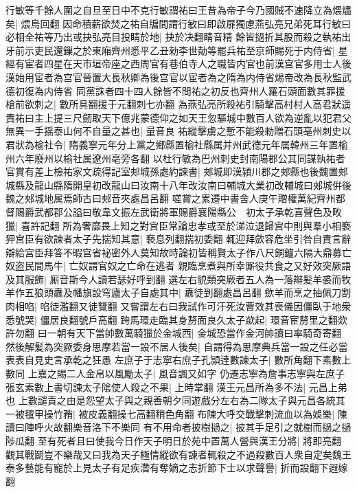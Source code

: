 行敏等千餘人圍之自旦至日中不克行敏謂祐曰王昔為帝子今乃國賊不速降立為煨燼矣|{
	煨烏回翻}
因命積薪欲焚之祐自牖間謂行敏曰即啟扉獨慮燕弘亮兄弟死耳行敏曰必相全祐等乃出或抉弘亮目投睛於地|{
	抉於决翻睛音精}
餘皆撾折其股而殺之執祐出牙前示吏民還鏁之於東廂齊州悉平乙丑勑李世勣等罷兵祐至京師賜死于内侍省|{
	星經有宦者四星在天市垣帝座之西周官有巷伯寺人之職皆内官也前漢宫官多用士人後漢始用宦者為宫官晉置大長秋卿為後宫官以宦者為之隋為内侍省焬帝改為長秋監武德初復為内侍省}
同黨誅者四十四人餘皆不問祐之初反也齊州人羅石頭面數其罪援槍前欲刺之|{
	數所具翻援于元翻刺七亦翻}
為燕弘亮所殺祐引騎擊高村村人高君狀遥責祐曰主上提三尺劒取天下億兆蒙德仰之如天王忽驅城中數百人欲為逆亂以犯君父無異一手揺泰山何不自量之甚也|{
	量音良}
祐縱擊虜之慙不能殺勑贈石頭亳州刺史以君狀為榆社令|{
	隋義寧元年分上黨之鄉縣置榆社縣属并州武德元年属韓州三年置榆州六年廢州以榆社属遼州亳旁各翻}
以杜行敏為巴州刺史封南陽郡公其同謀執祐者官賞有差上檢祐家文疏得記室郟城孫處約諫書|{
	郟城即漢潁川郡之郟縣也後魏置郟城縣及龍山縣隋開皇初改龍山曰汝南十八年改汝南曰輔城大業初改輔城曰郟城倂後魏之郟城地属焉師古曰郟音夾處昌呂翻}
嗟賞之累遷中書舍人庚午贈權萬紀齊州都督賜爵武都郡公謚曰敬韋文振左武衛將軍賜爵襄陽縣公　初太子承乾喜聲色及畋獵|{
	喜許記翻}
所為奢靡畏上知之對宫臣常論忠孝或至於涕泣退歸宫中則與羣小相䙝狎宫臣有欲諫者太子先揣知其意|{
	䙝息列翻揣初委翻}
輒迎拜歛容危坐引咎自責言辭辯給宫臣拜答不暇宫省袐密外人莫知故時論初皆稱賢太子作八尺銅鑪六隔大鼎募亡奴盗民間馬牛|{
	亡奴謂官奴之亡命在逃者}
親臨烹煮與所幸厮役共食之又好效突厥語及其服飾|{
	厮音斯今人讀若瑟好呼到翻}
選左右貌類突厥者五人為一落辮髪羊裘而牧羊作五狼頭纛及幡旗設穹廬太子自處其中|{
	纛徒到翻處昌呂翻}
歛羊而烹之抽佩刀割肉相啗|{
	啗徒濫翻又徒覽翻}
又嘗謂左右曰我試作可汗死汝曹效其喪儀因僵臥于地衆悉號哭|{
	僵居良翻號戶高翻}
跨馬環走臨其身剺面良久太子歘起|{
	環音宦剺里之翻欻許勿翻}
曰一朝有天下當帥數萬騎獵於金城西|{
	金城恐當作金河帥讀曰率騎奇寄翻}
然後解髪為突厥委身思摩若當一設不居人後矣|{
	自謂得為思摩典兵當一設之任必當表表自見史言承乾之狂愚}
左庶子于志寧右庶子孔頴逹數諫太子|{
	數所角翻下素數上數同}
上嘉之賜二人金帛以風勵太子|{
	風音諷又如字}
仍遷志寧為詹事志寧與左庶子張玄素數上書切諫太子隂使人殺之不果|{
	上時掌翻}
漢王元昌所為多不法|{
	元昌上弟也}
上數譴責之由是怨望太子與之親善朝夕同遊戲分左右為二隊太子與元昌各統其一被氊甲操竹矟|{
	被皮義翻操七高翻稍色角翻}
布陳大呼交戰擊刺流血以為娛樂|{
	陳讀曰陣呼火故翻樂音洛下不樂同}
有不用命者披樹撾之|{
	披其手足引之就樹而撾之撾陟瓜翻}
至有死者且曰使我今日作天子明日於苑中置萬人營與漢王分將|{
	將即亮翻}
觀其戰鬬豈不樂哉又曰我為天子極情縱欲有諫者輒殺之不過殺數百人衆自定矣魏王泰多藝能有寵於上見太子有足疾濳有奪嫡之志折節下士以求聲譽|{
	折而設翻下遐嫁翻}
